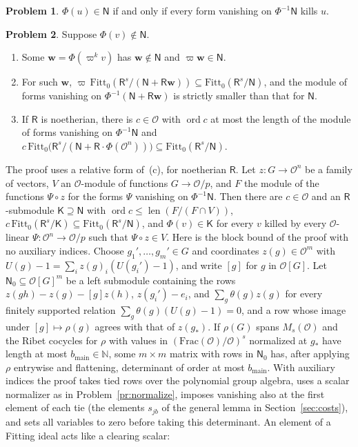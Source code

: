 \documentclass[reqno]{amsart}
\theoremstyle{definition}
\newtheorem{problem}{Problem}[section]
\theoremstyle{plain}
\newcommand{\Oc}{\mathcal{O}}
\newcommand{\ord}{\operatorname{ord}}
\newcommand{\len}{\operatorname{len}}
\newcommand{\Fitt}{\mathrm{Fitt}_0}
\begin{document}
\begin{problem}\label{pr:forms}
\(\Phi(u) \in \mathsf N\) if and only if every form vanishing on \(\Phi^{-1}\mathsf N\) kills \(u\).
\end{problem}

\begin{problem}\label{pr:fitting-step}
Suppose \(\Phi(v) \notin \mathsf N\).
\begin{enumerate}
\item[(a)] Some \(\mathbf w = \Phi(\varpi^k v)\) has \(\mathbf w \notin \mathsf N\) and \(\varpi \mathbf w \in \mathsf N\).
\item[(b)] For such \(\mathbf w\), \(\varpi\,\Fitt(\mathsf R^s/(\mathsf N + \mathsf R\mathbf w)) \subseteq \Fitt(\mathsf R^s/\mathsf N)\), and the module of forms vanishing on \(\Phi^{-1}(\mathsf N + \mathsf R\mathbf w)\) is strictly smaller than that for \(\mathsf N\).
\item[(c)] If \(\mathsf R\) is noetherian, there is \(c \in \Oc\) with \(\ord c\) at most the length of the module of forms vanishing on \(\Phi^{-1}\mathsf N\) and \(c\,\Fitt\bigl(\mathsf R^s/(\mathsf N + \mathsf R \cdot \Phi(\Oc^n))\bigr) \subseteq \Fitt(\mathsf R^s/\mathsf N)\).
\end{enumerate}
\end{problem}

The proof uses a relative form of~(c), for noetherian \(\mathsf R\).  Let \(z \colon G \to \Oc^n\) be a family of vectors, \(V\) an \(\Oc\)-module of functions \(G \to \Oc/p\), and \(F\) the module of the functions \(\Psi \circ z\) for the forms \(\Psi\) vanishing on \(\Phi^{-1}\mathsf N\).  Then there are \(c \in \Oc\) and an \(\mathsf R\)-submodule \(\mathsf K \supseteq \mathsf N\) with \(\ord c \le \len(F/(F \cap V))\), \(c\,\Fitt(\mathsf R^s/\mathsf K) \subseteq \Fitt(\mathsf R^s/\mathsf N)\), and \(\Phi(v) \in \mathsf K\) for every \(v\) killed by every \(\Oc\)-linear \(\Psi \colon \Oc^n \to \Oc/p\) such that \(\Psi \circ z \in V\).  Here is the block bound of the proof with no auxiliary indices.  Choose \(g_1', \dots, g_m' \in G\) and coordinates \(z(g) \in \Oc^m\) with \(U(g) - 1 = \sum_i z(g)_i(U(g_i') - 1)\), and write \([g]\) for \(g\) in \(\Oc[G]\).  Let \(\mathsf N_0 \subseteq \Oc[G]^m\) be a left submodule containing the rows \(z(gh) - z(g) - [g]z(h)\), \(z(g_i') - e_i\), and \(\sum_g \theta(g)z(g)\) for every finitely supported relation \(\sum_g\theta(g)(U(g) - 1) = 0\), and a row whose image under \([g] \mapsto \rho(g)\) agrees with that of \(z(g_*)\).  If \(\rho(G)\) spans \(M_s(\Oc)\) and the Ribet cocycles for \(\rho\) with values in \((\mathrm{Frac}(\Oc)/\Oc)^s\) normalized at \(g_*\) have length at most \(b_{\mathrm{main}} \in \mathbb{N}\), some \(m \times m\) matrix with rows in \(\mathsf N_0\) has, after applying \(\rho\) entrywise and flattening, determinant of order at most \(b_{\mathrm{main}}\).  With auxiliary indices the proof takes tied rows over the polynomial group algebra, uses a scalar normalizer as in Problem~\ref{pr:normalize}, imposes vanishing also at the first element of each tie (the elements \(s_{jb}\) of the general lemma in Section~\ref{sec:costs}), and sets all variables to zero before taking this determinant.  An element of a Fitting ideal acts like a clearing scalar:
\end{document}
